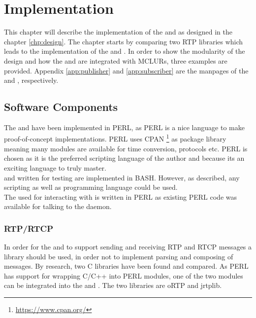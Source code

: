 \chapter{Implementation} \label{chp:implementation}
This chapter will describe the implementation of the \pub{} and \sub{} as designed in the chapter \ref{chp:design}. The chapter starts by comparing two RTP libraries which leads to the implementation of the \pubs{} and \sub{}. In order to show the modularity of the design and how the \pubs{} and \subs{} are integrated with MCLURs, three examples are provided. Appendix \ref{app:publisher} and \ref{app:subscriber} are the manpages of the \pub{} and \sub{}, respectively.

\section{Software Components}
The \pub{} and \sub{} have been implemented in PERL, as PERL is a nice language to make proof-of-concept implementations. PERL uses CPAN \footnote{\url{https://www.cpan.org/}} as package library meaning many modules are available for time conversion, protocols etc. PERL is chosen as it is the preferred scripting language of the author and because its an exciting language to truly master.\\

\noindent{}\pros{} and \cons{} written for testing are implemented in BASH. However, as described, any scripting as well as programming language could be used.\\

\noindent{} The \pro{} used for interacting with  is written in PERL as existing PERL code was available for talking to the  daemon.

\subsection{RTP/RTCP}
In order for the \pub{} and \sub{} to support sending and receiving RTP and RTCP messages a library should be used, in order not to implement parsing and composing of messages. By research, two C libraries have been found and compared. As PERL has support for wrapping C/C++ into PERL modules, one of the two modules can be integrated into the \subs{} and \pubs{}. The two libraries are oRTP and jrtplib.\\

